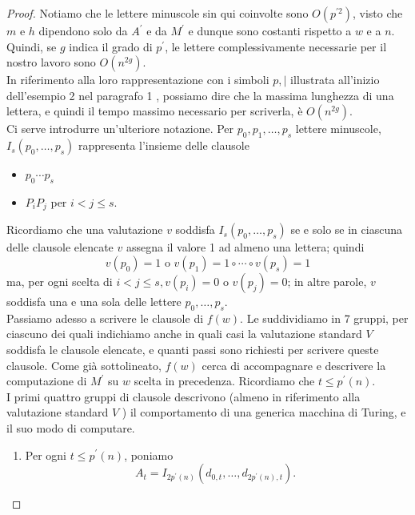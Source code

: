 \begin{proof}
    Notiamo che le lettere minuscole sin qui coinvolte sono
    $O\left(p^{\prime2}\right)$, visto che $m$ e $h$ dipendono solo da
    $A^{\prime}$ e da $M^{\prime}$ e dunque sono costanti rispetto a $w$ e a
    $n$. Quindi, se $g$ indica il grado di $p^{\prime}$, le lettere
    complessivamente necessarie per il nostro lavoro sono $O\left(n^{2
            g}\right)$.\\
    In riferimento alla loro rappresentazione con i simboli $p, \mid$ illustrata
    all'inizio dell'esempio 2 nel paragrafo 1 , possiamo dire che la massima
    lunghezza di una lettera, e quindi il tempo massimo necessario per
    scriverla, è $O\left(n^{2 g}\right)$.\\
    Ci serve introdurre un'ulteriore notazione. Per $p_0, p_1, \ldots, p_s$
    lettere minuscole, $I_s\left(p_0, \ldots, p_s\right)$ rappresenta l'insieme
    delle clausole
    \begin{itemize}
        \item $p_0 \cdots p_s$
        \item $P_i P_j$ per $i<j \leq s$.
    \end{itemize}
    Ricordiamo che una valutazione $v$ soddisfa $I_s\left(p_0, \ldots,
        p_s\right)$ se e solo se in ciascuna delle clausole elencate $v$ assegna
    il valore 1 ad almeno una lettera; quindi
    $$
        v\left(p_0\right)=1 \text { o } v\left(p_1\right)=1 \circ \cdots \circ v\left(p_s\right)=1
    $$
    ma, per ogni scelta di $i<j \leq s, v\left(p_i\right)=0$ o
    $v\left(p_j\right)=0$; in altre parole, $v$ soddisfa una e una sola delle
    lettere $p_0, \ldots, p_s$.\\
    Passiamo adesso a scrivere le clausole di $f(w)$. Le suddividiamo in 7
    gruppi, per ciascuno dei quali indichiamo anche in quali casi la valutazione
    standard $V$ soddisfa le clausole elencate, e quanti passi sono richiesti
    per scrivere queste clausole. Come già sottolineato, $f(w)$ cerca di
    accompagnare e descrivere la computazione di $M^{\prime}$ su $w$ scelta in
    precedenza. Ricordiamo che $t \leq p^{\prime}(n)$.\\
    I primi quattro gruppi di clausole descrivono (almeno in riferimento alla
    valutazione standard $V$ ) il comportamento di una generica macchina di
    Turing, e il suo modo di computare.
    \begin{enumerate}
        \item Per ogni $t \leq p^{\prime}(n)$, poniamo
              $$
                  A_t=I_{2 p^{\prime}(n)}\left(d_{0, t}, \ldots, d_{2 p^{\prime}(n), t}\right) \text {. }
$$
\end{enumerate}
\end{proof}
